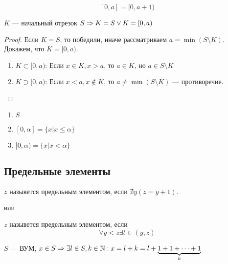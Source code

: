 \begin{note}
    \[[0, a] = [0, a + 1)\]
\end{note}

\begin{theorem}
    \(K\) --- начальный отрезок \(S \Rightarrow K = S \vee K = [0, a)\)
\end{theorem}
\begin{proof}
    Если \(K = S\), то победили, иначе рассматриваем \(a = \min(S \setminus K)\). Докажем, что \(K = [0, a)\).
    \begin{enumerate}
        \item \(K \subset [0, a)\): Если \(x \in K, x > a\), то \(a \in K\), но \(a \in S \setminus K\)
        \item \(K \supset [0, a)\): Если \(x < a, x \notin K\), то \(a \ne \min(S \setminus K)\) --- противоречие.
    \end{enumerate}
\end{proof}

\begin{example}\indent
    \begin{enumerate}
        \item \(S\)
        \item \([0, \alpha] = \{x | x \le \alpha\}\)
        \item \([0, \alpha) = \{x | x < \alpha\}\)
    \end{enumerate}
\end{example}

\subsection{Предельные элементы}
\begin{definition}
    \(z\) назывется предельным элементом, если \(\nexists y (z = y + 1)\).
\end{definition}
или 
\begin{definition}
    \(z\) назывется предельным элементом, если
    \[\forall y < z \exists t \in (y, z)\]
\end{definition}

\begin{theorem}
    \(S\) --- ВУМ, \(x \in S \Rightarrow \exists l \in S, k \in \mathbb{N}: x = l + k = l + \underbrace{1 + 1 + \dots + 1}_{k} \)
\end{theorem}

